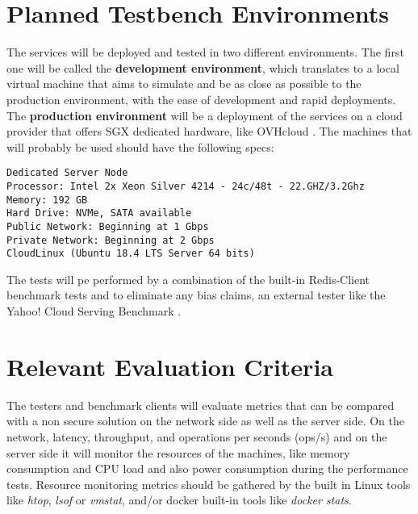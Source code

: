 \section{Planned Testbench Environments} %
\label{sec:planned_testbench_environments}

The services will be deployed and tested in two different environments. The first one will be called the \textbf{development environment}, which translates to a local virtual machine that aims to simulate and be as close as possible to the production environment, with the ease of development and rapid deployments. The \textbf{production environment} will be a deployment of the services on a cloud provider that offers \gls{SGX} dedicated hardware, like OVHcloud \cite{ovhcloud:1}. The machines that will probably be used should have the following specs:

\lstset{numbers=none, caption=Machine Specifications, label=lst:machine_specs}
\begin{lstlisting}
Dedicated Server Node
Processor: Intel 2x Xeon Silver 4214 - 24c/48t - 22.GHZ/3.2Ghz
Memory: 192 GB
Hard Drive: NVMe, SATA available
Public Network: Beginning at 1 Gbps
Private Network: Beginning at 2 Gbps
CloudLinux (Ubuntu 18.4 LTS Server 64 bits)
\end{lstlisting}

The tests will pe performed by a combination of the built-in Redis-Client benchmark tests \cite{redis_benchmark_cli:1} and to eliminate any bias claims, an external tester like the Yahoo! Cloud Serving Benchmark \cite{yahoo_benchmark:1}.

\section{Relevant Evaluation Criteria} %
\label{sec:relevant_evaluation_criteria}

The testers and benchmark clients will evaluate metrics that can be compared with a non secure solution on the network side as well as the server side. On the network, latency, throughput, and operations per seconds (ops/s) and on the server side it will monitor the resources of the machines, like memory consumption and CPU load and also power consumption during the performance tests. Resource monitoring metrics should be gathered by the built in Linux tools like \textit{htop}, \textit{lsof} or \textit{vmstat}, and/or docker built-in tools like \textit{docker stats}.